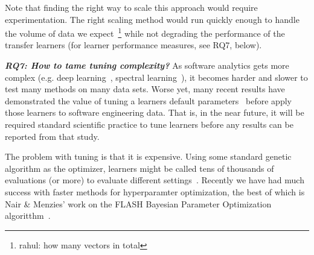 Note that finding the right way to scale this approach would require experimentation. The right scaling method
would run quickly enough to handle the volume of data we expect~\footnote{rahul: how many vectors in total}  while
not degrading the performance of the transfer learners (for learner performance measures, see RQ7, below).


\textit{\textbf{ RQ7: How to tame tuning complexity?}} As software analytics gets more complex (e.g. deep learning~\cite{fu17}, spectral learning~\cite{Wang:2016,nair2017faster}), it becomes
harder and slower to test many methods on many data sets.
Worse yet, many recent results have demonstrated the value of tuning
a learners default parameters~\cite{agrawal17,agrawal2018wrong,Tantithamthavorn18,fu2016tuning} before apply those learners to software engineering data.
That is, in the near future, it will be required standard scientific
practice to tune learners before any results can be reported from that study.

 

The problem with tuning is that it is expensive.
Using 
some
standard genetic algorithm as the optimizer,  learners might be called tens of thousands
of evaluations (or more)  to evaluate different settings~\cite{menzies18}.  Recently
we have had much success with faster methods for hyperparamter optimization, the best of which is Nair \& Menzies' work on the FLASH Bayesian Parameter Optimization algoritthm~\cite{nair18tse}. 



